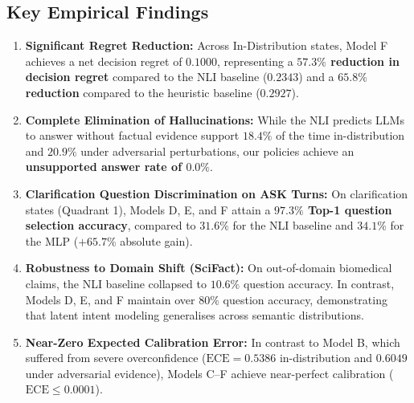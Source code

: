 \subsection{Key Empirical Findings}
\begin{enumerate}
    \item \textbf{Significant Regret Reduction:} Across In-Distribution states, Model F achieves a net decision regret of $0.1000$, representing a \textbf{$57.3\%$ reduction in decision regret} compared to the NLI baseline ($0.2343$) and a \textbf{$65.8\%$ reduction} compared to the heuristic baseline ($0.2927$).
    \item \textbf{Complete Elimination of Hallucinations:} While the NLI predicts LLMs to answer without factual evidence support $18.4\%$ of the time in-distribution and $20.9\%$ under adversarial perturbations, our policies achieve an \textbf{unsupported answer rate of $0.0\%$}.
    \item \textbf{Clarification Question Discrimination on ASK Turns:} On clarification states (Quadrant 1), Models D, E, and F attain a \textbf{$97.3\%$ Top-1 question selection accuracy}, compared to $31.6\%$ for the NLI baseline and $34.1\%$ for the MLP ($+65.7\%$ absolute gain).
    \item \textbf{Robustness to Domain Shift (SciFact):} On out-of-domain biomedical claims, the NLI baseline collapsed to $10.6\%$ question accuracy. In contrast, Models D, E, and F maintain over \textbf{$80\%$} question accuracy, demonstrating that latent intent modeling generalises across semantic distributions.
    \item \textbf{Near-Zero Expected Calibration Error:} In contrast to Model B, which suffered from severe overconfidence ($\text{ECE} = 0.5386$ in-distribution and $0.6049$ under adversarial evidence), Models C--F achieve near-perfect calibration ($\text{ECE} \le 0.0001$).
\end{enumerate}
